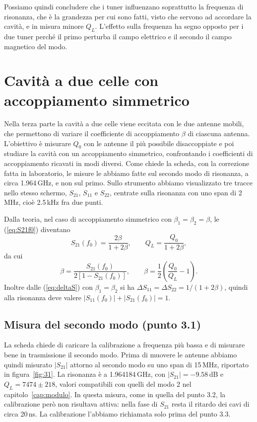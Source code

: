 \documentclass[11pt,a4paper,oneside]{book}
\begin{document}
Possiamo quindi concludere che i tuner influenzano soprattutto la frequenza di risonanza, che è la grandezza per cui sono fatti, visto che servono ad accordare la cavità, e in misura minore $Q_L$. L'effetto sulla frequenza ha segno opposto per i due tuner perché il primo perturba il campo elettrico e il secondo il campo magnetico del modo.

\chapter{Cavità a due celle con accoppiamento simmetrico}
\label{cap:simm}

Nella terza parte la cavità a due celle viene eccitata con le due antenne mobili, che permettono di variare il coefficiente di accoppiamento $\beta$ di ciascuna antenna. L'obiettivo è misurare $Q_0$ con le antenne il più possibile disaccoppiate e poi studiare la cavità con un accoppiamento simmetrico, confrontando i coefficienti di accoppiamento ricavati in modi diversi. Come chiede la scheda, con la correzione fatta in laboratorio, le misure le abbiamo fatte sul secondo modo di risonanza, a circa 1.964\,GHz, e non sul primo. Sullo strumento abbiamo visualizzato tre tracce nello stesso schermo, $S_{21}$, $S_{11}$ e $S_{22}$, centrate sulla risonanza con uno span di 2\,MHz, cioè 2.5\,kHz fra due punti.

Dalla teoria, nel caso di accoppiamento simmetrico con $\beta_1=\beta_2=\beta$, le (\ref{eq:S21f0}) diventano
\begin{equation}
S_{21}(f_0)=\frac{2\beta}{1+2\beta},\qquad Q_L=\frac{Q_0}{1+2\beta},
\label{eq:simm}
\end{equation}
da cui
\begin{equation}
\beta=\frac{S_{21}(f_0)}{2\left[1-S_{21}(f_0)\right]},\qquad \beta=\frac{1}{2}\left(\frac{Q_0}{Q_L}-1\right).
\label{eq:betasimm}
\end{equation}
Inoltre dalle (\ref{eq:deltaS}) con $\beta_1=\beta_2$ si ha $\Delta S_{11}=\Delta S_{22}=1/(1+2\beta)$, quindi alla risonanza deve valere $|S_{11}(f_0)|+|S_{21}(f_0)|=1$.

\section{Misura del secondo modo (punto 3.1)}
La scheda chiede di caricare la calibrazione a frequenza più bassa e di misurare bene in trasmissione il secondo modo. Prima di muovere le antenne abbiamo quindi misurato $|S_{21}|$ attorno al secondo modo su uno span di 15\,MHz, riportato in figura~\ref{fig:31}. La risonanza è a 1.964184\,GHz, con $|S_{21}|=-9.58$\,dB e $Q_L=7474\pm218$, valori compatibili con quelli del modo 2 nel capitolo~\ref{cap:modulo}. In questa misura, come in quella del punto 3.2, la calibrazione però non risultava attiva: nella fase di $S_{21}$ resta il ritardo dei cavi di circa 20\,ns. La calibrazione l'abbiamo richiamata solo prima del punto 3.3.
\end{document}
